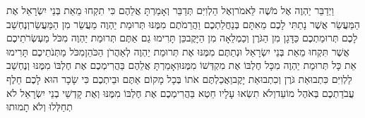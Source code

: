 \documentclass[../main/main.tex]{subfiles}
\begin{document}
\begin{multicols*}{\ncols}
וַיְדַבֵּר יַהְוֶה אֶל מֹשֶׁה לֵּאמֹר\PreVerseSpace{}וְאֶל הַלְוִיִּם תְּדַבֵּר וְאָמַרְתָּ אֲלֵהֶם כִּי תִקְחוּ מֵאֵת בְּנֵי יִשְׂרָאֵל אֶת הַמַּעֲשֵׂר אֲשֶׁר נָתַתִּי לָכֶם מֵאִתָּם בְּנַחֲלַתְכֶם וַהֲרֵמֹתֶם מִמֶּנּוּ תְּרוּמַת יַהְוֶה מַעֲשֵׂר מִן הַמַּעֲשֵׂר\PreVerseSpace{}וְנֶחְשַׁב לָכֶם תְּרוּמַתְכֶם כַּדָּגָן מִן הַגֹּרֶן וְכַמְלֵאָה מִן הַיָּקֶב\PreVerseSpace{}כֵּן תָּרִימוּ גַם אַתֶּם תְּרוּמַת יַהְוֶה מִכֹּל מַעְשְׂרֹתֵיכֶם אֲשֶׁר תִּקְחוּ מֵאֵת בְּנֵי יִשְׂרָאֵל וּנְתַתֶּם מִמֶּנּוּ אֶת תְּרוּמַת יַהְוֶה לְאַהֲרֹן הַכֹּהֵן\PreVerseSpace{}מִכֹּל מַתְּנֹתֵיכֶם תָּרִימוּ אֵת כָּל תְּרוּמַת יַהְוֶה מִכָּל חֶלְבּוֹ אֶת מִקְדְּשׁוֹ מִמֶּנּוּ\PreVerseSpace{}וְאָמַרְתָּ אֲלֵהֶם בַּהֲרִימְכֶם אֶת חֶלְבּוֹ מִמֶּנּוּ וְנֶחְשַׁב לַלְוִיִּם כִּתְבוּאַת גֹּרֶן וְכִתְבוּאַת יָקֶב\PreVerseSpace{}וַאֲכַלְתֶּם אֹתוֹ בְּכָל מָקוֹם אַתֶּם וּבֵיתְכֶם כִּי שָׂכָר הוּא לָכֶם חֵלֶף עֲבֹדַתְכֶם בְּאֹהֶל מוֹעֵד\PreVerseSpace{}וְלֹא תִשְׂאוּ עָלָיו חֵטְא בַּהֲרִימְכֶם אֶת חֶלְבּוֹ מִמֶּנּוּ וְאֶת קָדְשֵׁי בְנֵי יִשְׂרָאֵל לֹא תְחַלְּלוּ וְלֹא תָמוּתוּ\OpenSection{}\par

\end{multicols*}
\end{document}

